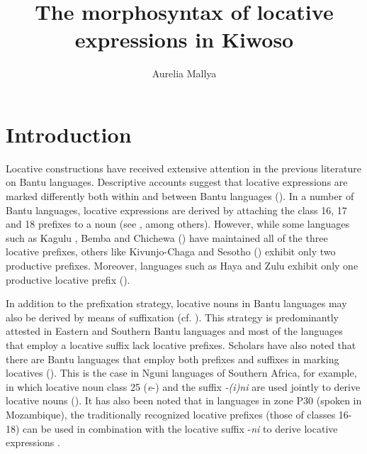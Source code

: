 \documentclass[output=paper]{langscibook}
\author{Aurelia Mallya\orcid{}\affiliation{University of Dar es Salaam}}
\title{The morphosyntax of locative expressions in Kiwoso}
\begin{document}
\judgewidth{**}
\maketitle 

\section{Introduction}
\label{sec:mallya:1}
Locative constructions have received extensive attention in the previous literature on Bantu languages. Descriptive accounts suggest that locative expressions are marked differently both within and between Bantu languages (\citealt{MartenEtAl2007, PersohnDevos2017}). In a number of Bantu languages, locative expressions are derived by attaching the class 16, 17 and 18 prefixes to a noun (see \citealt{Rugemalira2004, Petzell2008, RiedelMarten2012, Guérois2016, VandeVelde2019}, among others). However, while some languages such as Kagulu \citep{Petzell2008}, Bemba \citep{Marten2012} and Chichewa (\citealt{BresnanKanerva1989}) have maintained all of the three locative prefixes, others like Kivunjo-Chaga \citep{Moshi1995} and Sesotho (\citealt{DemuthMmusi1997}) exhibit only two productive prefixes. Moreover, languages such as Haya and Zulu exhibit only one productive locative prefix (\citealt{RiedelMarten2012}).

In addition to the prefixation strategy, locative nouns in Bantu languages may also be derived by means of suffixation (cf. \citealt{Grégoire1975, Guérois2016}). This strategy is predominantly attested in Eastern and Southern Bantu languages and most of the languages that employ a locative suffix lack locative prefixes. Scholars have also noted that there are Bantu languages that employ both prefixes and suffixes in marking locatives (\citealt{Marten2010, Marten2012}). This is the case in Nguni languages of Southern Africa, for example, in which locative noun class 25 (\textit{e}{}-) and the suffix \textit{{}-(i)ni} are used jointly to derive locative nouns (\citealt{vanderSpuy2014}). It has also been noted that in languages in zone P30 (spoken in Mozambique), the traditionally recognized locative prefixes (those of classes 16-18) can be used in combination with the locative suffix -\textit{ni} to derive locative expressions \citep{Guérois2016}.
\end{document}
